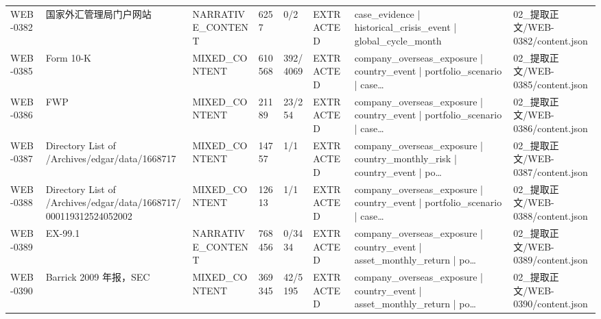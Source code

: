 \begin{landscape}
\begin{longtable}{p{1.8cm}p{4.2cm}p{3.0cm}p{1.4cm}p{1.6cm}p{2.4cm}p{4.2cm}p{4.2cm}}
WEB-0382 & 国家外汇管理局门户网站 & NARRATIVE\_\allowbreak{}CONTENT & 6257 & 0/\allowbreak{}2 & EXTRACTED & case\_\allowbreak{}evidence | historical\_\allowbreak{}crisis\_\allowbreak{}event | global\_\allowbreak{}cycle\_\allowbreak{}month & 02\_\allowbreak{}提取正文/\allowbreak{}WEB-0382/\allowbreak{}content.json\\
WEB-0385 & Form 10-K & MIXED\_\allowbreak{}CONTENT & 610568 & 392/\allowbreak{}4069 & EXTRACTED & company\_\allowbreak{}overseas\_\allowbreak{}exposure | country\_\allowbreak{}event | portfolio\_\allowbreak{}scenario | case… & 02\_\allowbreak{}提取正文/\allowbreak{}WEB-0385/\allowbreak{}content.json\\
WEB-0386 & FWP & MIXED\_\allowbreak{}CONTENT & 21189 & 23/\allowbreak{}254 & EXTRACTED & company\_\allowbreak{}overseas\_\allowbreak{}exposure | country\_\allowbreak{}event | portfolio\_\allowbreak{}scenario | case… & 02\_\allowbreak{}提取正文/\allowbreak{}WEB-0386/\allowbreak{}content.json\\
WEB-0387 & Directory List of /\allowbreak{}Archives/\allowbreak{}edgar/\allowbreak{}data/\allowbreak{}1668717 & MIXED\_\allowbreak{}CONTENT & 14757 & 1/\allowbreak{}1 & EXTRACTED & company\_\allowbreak{}overseas\_\allowbreak{}exposure | country\_\allowbreak{}monthly\_\allowbreak{}risk | country\_\allowbreak{}event | po… & 02\_\allowbreak{}提取正文/\allowbreak{}WEB-0387/\allowbreak{}content.json\\
WEB-0388 & Directory List of /\allowbreak{}Archives/\allowbreak{}edgar/\allowbreak{}data/\allowbreak{}1668717/\allowbreak{}000119312524052002 & MIXED\_\allowbreak{}CONTENT & 12613 & 1/\allowbreak{}1 & EXTRACTED & company\_\allowbreak{}overseas\_\allowbreak{}exposure | country\_\allowbreak{}event | portfolio\_\allowbreak{}scenario | case… & 02\_\allowbreak{}提取正文/\allowbreak{}WEB-0388/\allowbreak{}content.json\\
WEB-0389 & EX-99.1 & NARRATIVE\_\allowbreak{}CONTENT & 768456 & 0/\allowbreak{}3434 & EXTRACTED & company\_\allowbreak{}overseas\_\allowbreak{}exposure | country\_\allowbreak{}event | asset\_\allowbreak{}monthly\_\allowbreak{}return | po… & 02\_\allowbreak{}提取正文/\allowbreak{}WEB-0389/\allowbreak{}content.json\\
WEB-0390 & Barrick 2009 年报，SEC & MIXED\_\allowbreak{}CONTENT & 369345 & 42/\allowbreak{}5195 & EXTRACTED & company\_\allowbreak{}overseas\_\allowbreak{}exposure | country\_\allowbreak{}event | asset\_\allowbreak{}monthly\_\allowbreak{}return | po… & 02\_\allowbreak{}提取正文/\allowbreak{}WEB-0390/\allowbreak{}content.json\\

\end{longtable}
\end{landscape}
